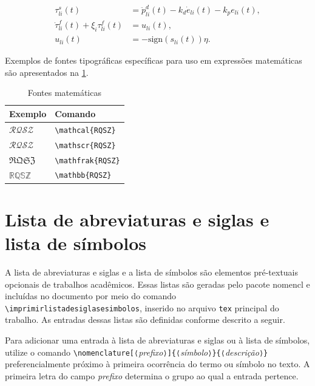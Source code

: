 
\begin{subequations}
\begin{align}
\tau_{li}^s(t) &= \ddot{p}^d_{li}(t) - k_{d} \dot{e}_{li}(t) - k_{p} e_{li}(t), \\
\dot{\tau}_{li}^f(t) +  \xi_{i} \tau_{li}^f(t) &= u_{li}(t),\label{eq:filtro_i} \\
u_{li}(t) &= - \textrm{sign}(s_{li}(t))\eta. \label{eq:u_xbi}
\end{align}
\end{subequations}

Exemplos de fontes tipográficas específicas para uso em expressões matemáticas são apresentados na \cref{tab:ftmath}.

\begin{table}[htb]
\centering
\caption{Fontes matemáticas}
\label{tab:ftmath}
\begin{tabular}{ll}
\toprule
Exemplo & Comando \\ \midrule
$\mathcal{RQSZ}$ & \verb|\mathcal{RQSZ}| \\
$\mathscr{RQSZ}$ & \verb|\mathscr{RQSZ}| \\
$\mathfrak{RQSZ}$ & \verb|\mathfrak{RQSZ}| \\
$\mathbb{RQSZ}$ & \verb|\mathbb{RQSZ}| \\
\bottomrule
\end{tabular}
\end{table}

\section{Lista de abreviaturas e siglas e lista de símbolos}

A lista de abreviaturas e siglas e a lista de símbolos são elementos pré-textuais opcionais de trabalhos acadêmicos. Essas listas são geradas pelo pacote \textsf{nomencl} e incluídas no documento por meio do comando \verb|\imprimirlistadesiglasesimbolos|, inserido no arquivo \texttt{tex} principal do trabalho. As entradas dessas listas são definidas conforme descrito a seguir.

Para adicionar uma entrada à lista de abreviaturas e siglas ou à lista de símbolos, utilize o comando \texttt{\textbackslash nomenclature[⟨}\emph{prefixo}\texttt{⟩]\{⟨}\emph{símbolo}\texttt{⟩\}\{⟨}\emph{descrição}\texttt{⟩\}} preferencialmente próximo à primeira ocorrência do termo ou símbolo no texto. A primeira letra do campo \emph{prefixo} determina o grupo ao qual a entrada pertence.

